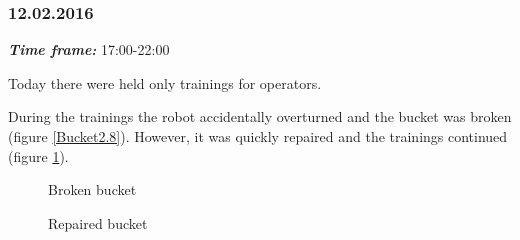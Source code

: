 \subsubsection{12.02.2016}
\textit{\textbf{Time frame:}} 17:00-22:00 

Today there were held only trainings for operators. 

During the trainings the robot accidentally overturned and the bucket was broken (figure \ref{Bucket2.8}). However, it was quickly repaired and the trainings continued (figure \ref{Bucket2.9}).

\begin{figure}[H]
	\begin{minipage}[h]{0.47\linewidth}
		\caption{Broken bucket}
		\label{Bucket2.8}
	\end{minipage}
	\hfill
	\begin{minipage}[h]{0.47\linewidth}
		\caption{Repaired bucket}
		\label{Bucket2.9}
	\end{minipage}
\end{figure}
